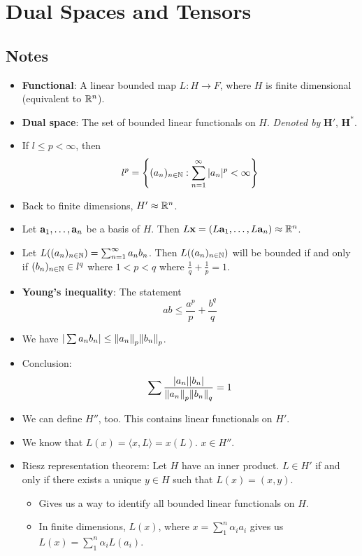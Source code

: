 \documentclass[../../notes.tex]{subfiles}
\begin{document}
\chapter{Dual Spaces and Tensors}
\section{Notes}
\begin{itemize}
    \item {}\textbf{Functional}: A linear bounded map $L:H\to F$, where $H$ is finite dimensional (equivalent to $\mathbb{R}^n$).
    \item \textbf{Dual space}: The set of bounded linear functionals on $H$. \emph{Denoted by} $\bm{H'}$, $\bm{H^*}$.
    \item If $l\leq p<\infty$, then
    \begin{equation*}
        l^p = \left\{ (a_n)_{n\in\mathbb{N}}:\sum_{n=1}^\infty|a_n|^p<\infty \right\}
    \end{equation*}
    \item Back to finite dimensions, $H'\approx\mathbb{R}^n$.
    \item Let $\mathbf{a}_1,\dots,\mathbf{a}_n$ be a basis of $H$. Then $L\mathbf{x}=(L\mathbf{a}_1,\dots,L\mathbf{a}_n)\approx\mathbb{R}^n$.
    \item Let $L((a_n)_{n\in\mathbb{N}})=\sum_{n=1}^\infty a_nb_n$. Then $L((a_n)_{n\in\mathbb{N}})$ will be bounded if and only if $(b_n)_{n\in\mathbb{N}}\in l^q$ where $1<p<q$ where $\frac{1}{q}+\frac{1}{p}=1$.
    \item \textbf{Young's inequality}: The statement
    \begin{equation*}
        ab \leq \frac{a^p}{p}+\frac{b^q}{q}
    \end{equation*}
    \item We have $|\sum a_nb_n|\leq\norm{a_n}_p\norm{b_n}_p$.
    \item Conclusion:
    \begin{equation*}
        \sum\frac{|a_n||b_n|}{\norm{a_n}_p\norm{b_n}_q} = 1
    \end{equation*}
    \item We can define $H''$, too. This contains linear functionals on $H'$.
    \item We know that $L(x)=\langle x,L\rangle=x(L)$. $x\in H''$.
    \item Riesz representation theorem: Let $H$ have an inner product. $L\in H'$ if and only if there exists a unique $y\in H$ such that $L(x)=(x,y)$.
    \begin{itemize}
        \item Gives us a way to identify all bounded linear functionals on $H$.
        \item In finite dimensions, $L(x)$, where $x=\sum_1^n\alpha_ia_i$ gives us $L(x)=\sum_1^n\alpha_iL(a_i)$.
    \end{itemize}
\end{itemize}
\end{document}
